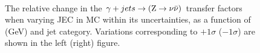 \begin{figure}[!h]
  \centering
   ~~
  \\

  \caption{\label{fig:tfSyst_jec_gjToZinv} The relative change in the
  $\gamma + jets \rightarrow ({\text Z} \rightarrow \nu\bar{\nu})$ transfer
  factors when varying JEC in MC within its uncertainties, as a function of \scalht (GeV) and jet category. 
  Variations corresponding to $+1\sigma$ ($-1\sigma$) are shown in the left (right) figure. 
  }
\end{figure}


